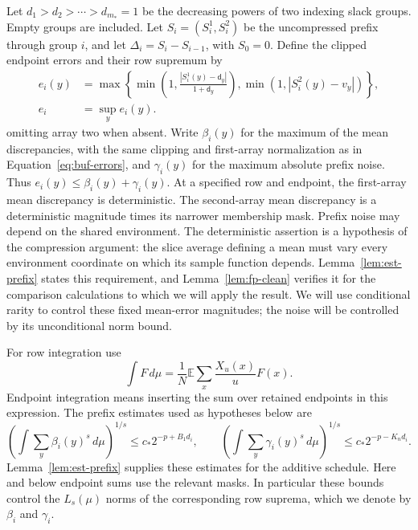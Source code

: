 Let $d_1>d_2>\cdots>d_{m_*}=1$ be the decreasing powers of two indexing
slack groups.  Empty groups are included.  Let $S_i=(S_i^1,S_i^2)$ be the
uncompressed prefix through group $i$, and let
$\Delta_i=S_i-S_{i-1}$, with $S_0=0$.  Define the clipped endpoint errors
and their row supremum by
\begin{equation}
 \begin{aligned}
 e_i(y)&=\max\left\{
 \min\left(1,\frac{|S_i^1(y)-\mathsf{d}_y|}{1+\mathsf{d}_y}\right),
 \min(1,|S_i^2(y)-v_y|)\right\},\\
 e_i&=\sup_y e_i(y).
 \end{aligned}
 \label{eq:buf-errors}
\end{equation}
omitting array two when absent.  Write $\beta_i(y)$ for the maximum of
the mean discrepancies, with the same clipping and first-array
normalization as in Equation~\eqref{eq:buf-errors}, and $\gamma_i(y)$ for
the maximum absolute prefix noise.  Thus
$e_i(y)\leq\beta_i(y)+\gamma_i(y)$.  At a specified row and endpoint, the
first-array mean discrepancy is deterministic.  The second-array mean
discrepancy is a deterministic magnitude times its narrower membership
mask.  Prefix noise may depend on the shared environment.
The deterministic assertion is a hypothesis of the compression argument:
the slice average defining a mean must vary every environment coordinate
on which its sample function depends.  Lemma~\ref{lem:est-prefix} states
this requirement, and Lemma~\ref{lem:fp-clean} verifies it for the comparison
calculations to which we will apply the result.  We will use conditional
rarity to control these fixed mean-error magnitudes; the noise will be
controlled by its unconditional norm bound.

For row integration use
\[
 \int F\,d\mu=\frac1N\mathbb E\sum_x\frac{X_u(x)}u F(x).
\]
Endpoint integration means inserting the sum over retained endpoints in
this expression.  The prefix estimates used as hypotheses below are
\begin{equation}
 \left(\int\sum_y\beta_i(y)^s\,d\mu\right)^{1/s}
       \leq c_*2^{-p+B_1d_i},\qquad
 \left(\int\sum_y\gamma_i(y)^s\,d\mu\right)^{1/s}
       \leq c_*2^{-p-K_nd_i}.
 \label{eq:buf-prefix-interface}
\end{equation}
Lemma~\ref{lem:est-prefix} supplies these estimates for the additive
schedule.  Here and below endpoint sums use the relevant masks.  In
particular these bounds control the $L_s(\mu)$ norms of the corresponding
row suprema, which we denote by $\beta_i$ and $\gamma_i$.

